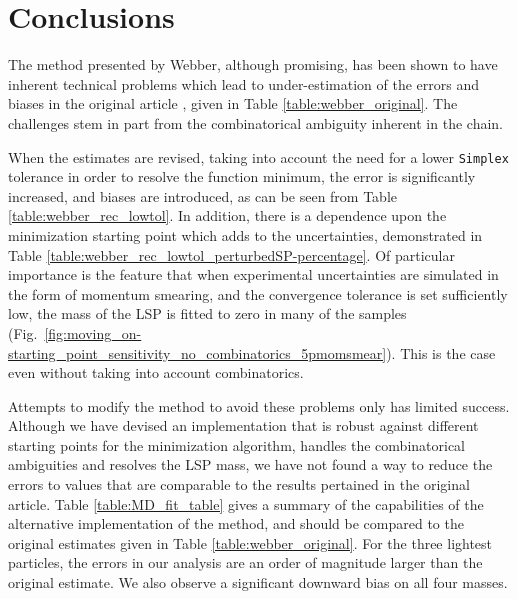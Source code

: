 \documentclass[twoside,english]{uiofysmaster}
\begin{document}












\chapter*{Conclusions} %
The method presented by Webber, although promising, has been shown to have inherent technical problems which lead to under-estimation of the errors and biases in the original article \cite{Webber:2009vm}, given in Table \ref{table:webber_original}. The challenges stem in part from the combinatorical ambiguity inherent in the chain. 

When the estimates are revised, taking into account the need for a lower {\tt Simplex} tolerance in order to resolve the function minimum, the error is significantly increased, and biases are introduced, as can be seen from Table \ref{table:webber_rec_lowtol}. In addition, there is a dependence upon the minimization starting point which adds to the uncertainties, demonstrated in Table \ref{table:webber_rec_lowtol_perturbedSP-percentage}. Of particular importance is the feature that when experimental uncertainties are simulated in the form of momentum smearing, and the convergence tolerance is set sufficiently low, the mass of the LSP is fitted to zero in many of the samples (Fig.\ \ref{fig:moving_on-starting_point_sensitivity_no_combinatorics_5pmomsmear}). This is the case even without taking into account combinatorics.

Attempts to modify the method to avoid these problems only has limited success. Although we have devised an implementation that is robust against different starting points for the minimization algorithm, handles the combinatorical ambiguities and resolves the LSP mass, we have not found a way to reduce the errors to values that are comparable to the results pertained in the original article. Table \ref{table:MD_fit_table} gives a summary of the capabilities of the alternative implementation of the method, and should be compared to the original estimates given in Table \ref{table:webber_original}. For the three lightest particles, the errors in our analysis are an order of magnitude larger than the original estimate. We also observe a significant downward bias on all four masses.
\end{document}

